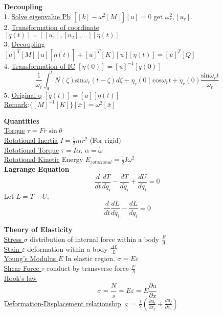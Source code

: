 \documentclass{article}
\begin{document}
\begin{multicols*}{3}
\noindent\textbf{Decoupling}\\
1. \underline{Solve eigenvalue Pb}
$[[k]-\omega^{2}[M]][u]=0$
get $\omega_{r}^{2},[u_{r}]$.\\
2. \underline{Transformation of coordinate}\\
$[q(t)]=[[u_{1}],[u_{2}],...][\eta(t)]$\\
3. \underline{Decoupling}\\
$[u]^{T}[M][u][\ddot{\eta(t)}]+[u]^{T}[K][u][\eta(t)]=[u]^{T}[Q]$\\
4. \underline{Transformation of IC} $[\eta(0)]=[u]^{-1}[q(0)]$
 $$
 \frac{1}{\omega_{r}}\int_{0}^{t}N(\zeta)\text{sin}\omega_{r}(t-\zeta)d\zeta+\eta_{r}(0)\text{cos}\omega_{r}t+\dot{\eta}_{r}(0)\frac{\text{sin}\omega_{r}t}{\omega_{r}}
 $$
5. \underline{Original q} $[q(t)]=[u][\eta(t)]$\\
\underline{Remark}:$\{[M]^{-1}[K]\}[\bar{x}]=\omega^{2}[\bar{x}]$

\noindent\textbf{Quantities}\\
\underline{Torque} $\tau = Fr \sin\theta$\\
\underline{Rotational Inertia} $I=\frac{1}{2}mr^2$ (For rigid)\\
\underline{Rotational Torque} $\tau = I\alpha$, $\alpha = \dot{\omega}$\\
\underline{Rotational Kinetic} Energy $E_{rotational}=\frac{1}{2}I\omega^2$\\

\noindent\textbf{Lagrange Equation}
\begin{equation*}
  \frac{d}{dt}\frac{dT}{d\dot{q_i}} - \frac{dT}{dq_i} + \frac{dU}{dq_i} = 0
\end{equation*}
Let $L = T - U$,
\begin{equation*}
  \frac{d}{dt}\frac{dL}{d\dot{q_i}} - \frac{dL}{dq_i} = 0
\end{equation*}

\noindent\textbf{Theory of Elasticity}\\
\underline{Stress $\sigma$} distribution of internal force within a body $\frac{F}{A}$\\
\underline{Stain $\varepsilon$} deformation within a body $\frac{\Delta L}{L}$\\
\underline{Young's Modulus $E$} In elastic region, $\sigma = E\varepsilon$\\
\underline{Shear Force $\tau$} conduct by transverse force $\frac{F}{A}$\\
\underline{Hook's law}
  \begin{equation*}
    \sigma=\frac{N}{s}=E\varepsilon=E\frac{\partial u}{\partial x}
  \end{equation*}
\underline{Deformation-Displacement relationship}
  $\varsigma=\frac{1}{2}(\frac{\partial u_{i}}{\partial x_{j}}+\frac{\partial u_{j}}{\partial x_{i}})$\\


\end{multicols*}
\end{document}
